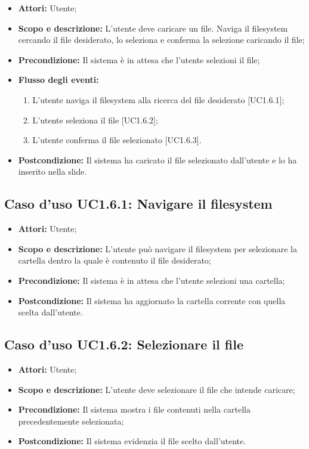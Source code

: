 \begin{itemize}
	\item \textbf{Attori:} Utente;
	\item \textbf{Scopo e descrizione:} L'utente deve caricare un file. Naviga il \gls{filesystem} cercando il file desiderato, lo seleziona e conferma la selezione caricando il file;
	\item \textbf{Precondizione:} Il sistema è in attesa che l'utente selezioni il file;
	\item \textbf{Flusso degli eventi:}
	\begin{enumerate}
		\item L'utente naviga il \gls{filesystem} alla ricerca del file desiderato [UC1.6.1];
		\item L'utente seleziona il file [UC1.6.2];
		\item L'utente conferma il file selezionato [UC1.6.3].
	\end{enumerate}
	\item \textbf{Postcondizione:} Il sistema ha caricato il file selezionato dall'utente e lo ha inserito nella slide.
\end{itemize}

\subsection{Caso d'uso UC1.6.1: Navigare il filesystem}
\begin{itemize}
	\item \textbf{Attori:} Utente;
	\item \textbf{Scopo e descrizione:} L'utente può navigare il \gls{filesystem} per selezionare la cartella dentro la quale è contenuto il file desiderato;
	\item \textbf{Precondizione:} Il sistema è in attesa che l'utente selezioni una cartella;
	\item \textbf{Postcondizione:} Il sistema ha aggiornato la cartella corrente con quella scelta dall'utente.
\end{itemize}

\subsection{Caso d'uso UC1.6.2: Selezionare il file}
\begin{itemize}
	\item \textbf{Attori:} Utente;
	\item \textbf{Scopo e descrizione:} L'utente deve selezionare il file che intende caricare;
	\item \textbf{Precondizione:} Il sistema mostra i file contenuti nella cartella precedentemente selezionata;
	\item \textbf{Postcondizione:} Il sistema evidenzia il file scelto dall'utente.
\end{itemize}

